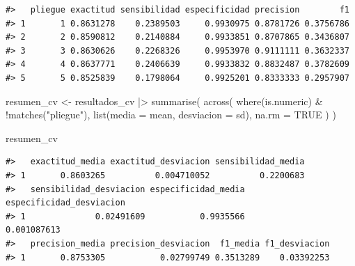 \documentclass[
  spanish,
  10.5pt,
  letterpaper,
  openany,
  headings=big]{scrbook}
\newenvironment{Shaded}{}{}
\newcommand{\AttributeTok}[1]{\textcolor[rgb]{0.84,0.23,0.29}{#1}}
\newcommand{\ConstantTok}[1]{\textcolor[rgb]{0.00,0.36,0.77}{#1}}
\newcommand{\FunctionTok}[1]{\textcolor[rgb]{0.44,0.26,0.76}{#1}}
\newcommand{\NormalTok}[1]{\textcolor[rgb]{0.14,0.16,0.18}{#1}}
\newcommand{\OtherTok}[1]{\textcolor[rgb]{0.44,0.26,0.76}{#1}}
\newcommand{\SpecialCharTok}[1]{\textcolor[rgb]{0.00,0.36,0.77}{#1}}
\newcommand{\StringTok}[1]{\textcolor[rgb]{0.01,0.18,0.38}{#1}}
\begin{document}
\begin{Shaded}
\end{Shaded}

\begin{verbatim}
#>   pliegue exactitud sensibilidad especificidad precision        f1
#> 1       1 0.8631278    0.2389503     0.9930975 0.8781726 0.3756786
#> 2       2 0.8590812    0.2140884     0.9933851 0.8707865 0.3436807
#> 3       3 0.8630626    0.2268326     0.9953970 0.9111111 0.3632337
#> 4       4 0.8637771    0.2406639     0.9933832 0.8832487 0.3782609
#> 5       5 0.8525839    0.1798064     0.9925201 0.8333333 0.2957907
\end{verbatim}

\begin{Shaded}
\begin{Highlighting}[]
\NormalTok{resumen\_cv }\OtherTok{\textless{}{-}}\NormalTok{ resultados\_cv }\SpecialCharTok{|\textgreater{}}
  \FunctionTok{summarise}\NormalTok{(}
    \FunctionTok{across}\NormalTok{(}
      \FunctionTok{where}\NormalTok{(is.numeric) }\SpecialCharTok{\&} \SpecialCharTok{!}\FunctionTok{matches}\NormalTok{(}\StringTok{"pliegue"}\NormalTok{),}
      \FunctionTok{list}\NormalTok{(}\AttributeTok{media =}\NormalTok{ mean, }\AttributeTok{desviacion =}\NormalTok{ sd),}
      \AttributeTok{na.rm =} \ConstantTok{TRUE}
\NormalTok{    )}
\NormalTok{  )}

\NormalTok{resumen\_cv}
\end{Highlighting}
\end{Shaded}

\begin{verbatim}
#>   exactitud_media exactitud_desviacion sensibilidad_media
#> 1       0.8603265          0.004710052          0.2200683
#>   sensibilidad_desviacion especificidad_media especificidad_desviacion
#> 1              0.02491609           0.9935566              0.001087613
#>   precision_media precision_desviacion  f1_media f1_desviacion
#> 1       0.8753305           0.02799749 0.3513289    0.03392253
\end{verbatim}
\end{document}
